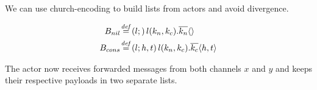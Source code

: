 We can use church-encoding to build lists from actors and avoid divergence.


\begin{align*}
  \adef*{B_{nil}}{l}{}{\arcv{l}{k_n,k_c} . \asnd{k_n}{}}
  \\
  \adef*{B_{cons}}{l}{h,t}{\arcv{l}{k_n,k_c} . \asnd{k_c}{h,t}}
\end{align*}

The actor now receives forwarded messages from both channels $x$ and $y$
and keeps their respective payloads in two separate lists.




